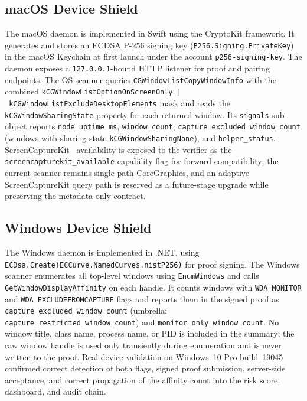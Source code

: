 \documentclass[conference]{IEEEtran}
\begin{document}
\subsection{macOS Device Shield}

The macOS daemon is implemented in Swift using the CryptoKit framework. It generates and stores an ECDSA P-256 signing key (\texttt{P256.Signing.PrivateKey}) in the macOS Keychain at first launch under the account \texttt{p256-signing-key}. The daemon exposes a \texttt{127.0.0.1}-bound HTTP listener for proof and pairing endpoints. The OS scanner queries \texttt{CGWindowListCopyWindowInfo} with the combined \texttt{kCGWindowListOptionOnScreenOnly~|~kCGWindowListExcludeDesktopElements} mask and reads the \texttt{kCGWindowSharingState} property for each returned window. Its \texttt{signals} sub-object reports \texttt{node\_uptime\_ms}, \texttt{window\_count}, \texttt{capture\_excluded\_window\_count} (windows with sharing state \texttt{kCGWindowSharingNone}), and \texttt{helper\_status}. ScreenCaptureKit~\cite{apple2025screencapturekit} availability is exposed to the verifier as the \texttt{screencapturekit\_available} capability flag for forward compatibility; the current scanner remains single-path CoreGraphics, and an adaptive ScreenCaptureKit query path is reserved as a future-stage upgrade while preserving the metadata-only contract.

\subsection{Windows Device Shield}

The Windows daemon is implemented in .NET, using \texttt{ECDsa.Create(ECCurve.NamedCurves.nistP256)} for proof signing. The Windows scanner enumerates all top-level windows using \texttt{EnumWindows} and calls \texttt{GetWindowDisplayAffinity} on each handle. It counts windows with \texttt{WDA\_MONITOR} and \texttt{WDA\_EXCLUDEFROMCAPTURE} flags and reports them in the signed proof as \texttt{capture\_excluded\_window\_count} (umbrella: \texttt{capture\_restricted\_window\_count}) and \texttt{monitor\_only\_window\_count}. No window title, class name, process name, or PID is included in the summary; the raw window handle is used only transiently during enumeration and is never written to the proof. Real-device validation on Windows~10 Pro build~19045 confirmed correct detection of both flags, signed proof submission, server-side acceptance, and correct propagation of the affinity count into the risk score, dashboard, and audit chain.
\end{document}
